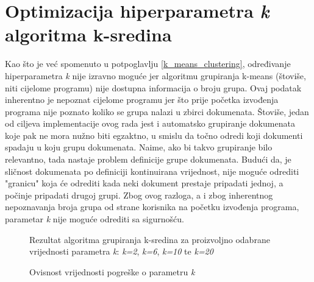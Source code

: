 \documentclass[times, utf8, zavrsni, numeric]{fer}
\begin{document}
\section{Optimizacija hiperparametra \textit{k} algoritma k-sredina}
\label{kmeans_optimization}
Kao što je već spomenuto u potpoglavlju \ref{k_means_clustering}, određivanje hiperparametra \textit{k} nije izravno moguće jer algoritmu grupiranja k-means (štoviše, niti cijelome programu) nije dostupna informacija o broju grupa. Ovaj podatak inherentno je nepoznat cijelome programu jer što prije početka izvođenja programa nije poznato koliko se grupa nalazi u zbirci dokumenata. Štoviše, jedan od ciljeva implementacije ovog rada jest i automatsko grupiranje dokumenata koje pak ne mora nužno biti egzaktno, u smislu da točno odredi koji dokumenti spadaju u koju grupu dokumenata. Naime, ako bi takvo grupiranje bilo relevantno, tada nastaje problem definicije grupe dokumenata. Budući da, je sličnost dokumenata po definiciji kontinuirana vrijednost, nije moguće odrediti "granicu" koja će odrediti kada neki dokument prestaje pripadati jednoj, a počinje pripadati drugoj grupi. Zbog ovog razloga, a i zbog inherentnog nepoznavanja broja grupa od strane korisnika na početku izvođenja programa, parametar \textit{k} nije moguće odrediti sa sigurnošću.
\begin{figure}
\caption{Rezultat algoritma grupiranja k-sredina za proizvoljno odabrane vrijednosti parametra \textit{k}: \textit{k=2}, \textit{k=6}, \textit{k=10} te \textit{k=20}}
\label{img:graph_kmeans}
\end{figure}
\begin{figure}[h]
\centering    
\def\svgwidth{\columnwidth}

\caption{Ovisnost vrijednosti pogreške o parametru \textit{k}}
\label{img:elbow}
\end{figure}
\end{document}
